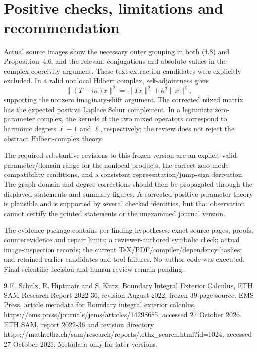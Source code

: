 \documentclass[10pt]{article}
\begin{document}
\section*{Positive checks, limitations and recommendation}
Actual source images show the necessary outer grouping in both (4.8) and Proposition 4.6, and the relevant conjugations and absolute values in the complex coercivity argument. These text-extraction candidates were explicitly excluded. In a valid nonlocal Hilbert complex, self-adjointness gives \[\|(T-i\kappa)x\|^2=\|Tx\|^2+\kappa^2\|x\|^2,\] supporting the nonzero imaginary-shift argument. The corrected mixed matrix has the expected positive Laplace Schur complement. In a legitimate zero-parameter complex, the kernels of the two mixed operators correspond to harmonic degrees \(\ell-1\) and \(\ell\), respectively; the review does not reject the abstract Hilbert-complex theory.\par
The required substantive revisions to this frozen version are an explicit valid parameter/domain range for the nonlocal products, the correct zero-mode compatibility conditions, and a consistent representation/jump-sign derivation. The graph-domain and degree corrections should then be propagated through the displayed statements and summary figures. A corrected positive-parameter theory is plausible and is supported by several checked identities, but that observation cannot certify the printed statements or the unexamined journal version.\par
The evidence package contains per-finding hypotheses, exact source pages, proofs, counterevidence and repair limits; a reviewer-authored symbolic check; actual image-inspection records; the current TeX/PDF/compiler/dependency hashes; and retained earlier candidates and tool failures. No author code was executed. Final scientific decision and human review remain pending.\par
9 E. Schulz, R. Hiptmair and S. Kurz, Boundary Integral Exterior Calculus, ETH SAM Research Report 2022-36, revision August 2022, frozen 39-page source. EMS Press, article metadata for Boundary integral exterior calculus, https://ems.press/journals/jems/articles/14298685, accessed 27 October 2026. ETH SAM, report 2022-36 and revision directory, https://math.ethz.ch/sam/research/reports/.ethz\_search.html?id=1024, accessed 27 October 2026. Metadata only for later versions.\par
\end{document}
